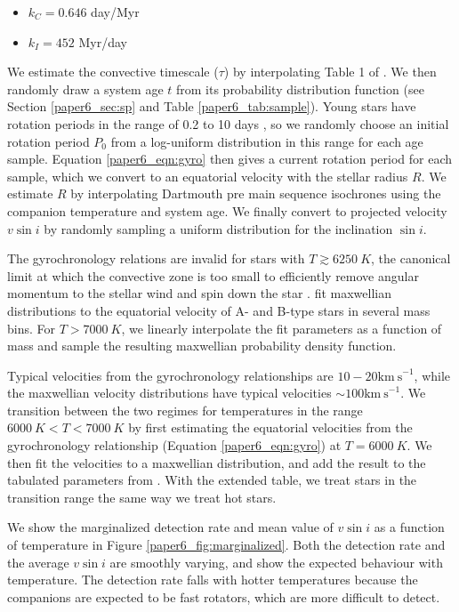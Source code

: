 \begin{itemize}
\item $k_C = 0.646$ day/Myr
\item $k_I = 452$ Myr/day
\end{itemize}
We estimate the convective timescale ($\tau$) by interpolating Table 1 of \citet{Barnes2010a}. We then randomly draw a system age $t$ from its probability distribution function (see Section \ref{paper6_sec:sp} and Table \ref{paper6_tab:sample}). Young stars have rotation periods in the range of 0.2 to 10 days \citep{Bouvier2014}, so we randomly choose an initial rotation period $P_0$ from a log-uniform distribution in this range for each age sample. Equation \ref{paper6_eqn:gyro} then gives a current rotation period for each sample, which we convert to an equatorial velocity with the stellar radius $R$. We estimate $R$ by interpolating Dartmouth pre main sequence isochrones \citep{Dotter2008} using the companion temperature and system age. We finally convert to projected velocity $v\sin{i}$ by randomly sampling a uniform distribution for the inclination $\sin{i}$.

The gyrochronology relations are invalid for stars with $T \gtrsim 6250\ K$, the canonical limit at which the convective zone is too small to efficiently remove angular momentum to the stellar wind and spin down the star \citep{Pinsonneault2001}. \citet{Zorec2012} fit maxwellian distributions to the equatorial velocity of A- and B-type stars in several mass bins. For $T > 7000\ K$, we linearly interpolate the fit parameters as a function of mass and sample the resulting maxwellian probability density function. 

Typical velocities from the gyrochronology relationships are $10-20 \mathrm{km\ s}^{-1}$, while the maxwellian velocity distributions have typical velocities $\sim 100 \mathrm{km\ s}^{-1}$. We transition between the two regimes for temperatures in the range $6000\ K < T < 7000\ K$ by first estimating the equatorial velocities from the gyrochronology relationship (Equation \ref{paper6_eqn:gyro}) at $T=6000\ K$. We then fit the velocities to a maxwellian distribution, and add the result to the tabulated parameters from \citep{Zorec2012}. With the extended table, we treat stars in the transition range the same way we treat hot stars.
 
We show the marginalized detection rate and mean value of $v\sin{i}$ as a function of temperature in Figure \ref{paper6_fig:marginalized}. Both the detection rate and the average $v\sin{i}$ are smoothly varying, and show the expected behaviour with temperature. The detection rate falls with hotter temperatures because the companions are expected to be fast rotators, which are more difficult to detect. 


